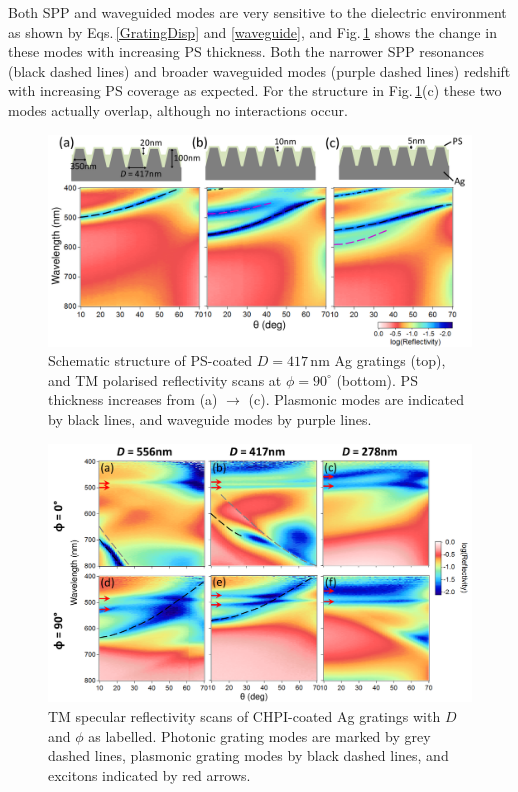 Both SPP and waveguided modes are very sensitive to the dielectric environment as shown by Eqs.\,\ref{GratingDisp} and \ref{waveguide}, and Fig.\,\ref{7Fig13} shows the change in these modes with increasing PS thickness. Both the narrower SPP resonances (black dashed lines) and broader waveguided modes (purple dashed lines) redshift with increasing PS coverage as expected. For the structure in Fig.\,\ref{7Fig13}(c) these two modes actually overlap, although no interactions occur.
\begin{figure}[h!] 
\centering    
\includegraphics[width=\textwidth]{Fig13}
\caption{Schematic structure of PS-coated $D=417$\,nm Ag gratings (top), and TM polarised reflectivity scans at $\phi=90^{\circ}$ (bottom). PS thickness increases from (a) $\rightarrow$ (c). Plasmonic modes are indicated by black lines, and waveguide modes by purple lines.}
\label{7Fig13}
\end{figure}

\begin{figure}[h!] 
\centering    
\includegraphics[width=\textwidth]{Fig14}
\caption{TM specular reflectivity scans of CHPI-coated Ag gratings with $D$ and $\phi$ as labelled. Photonic grating modes are marked by grey dashed lines, plasmonic grating modes by black dashed lines, and excitons indicated by red arrows.}
\label{7Fig14}
\end{figure}

